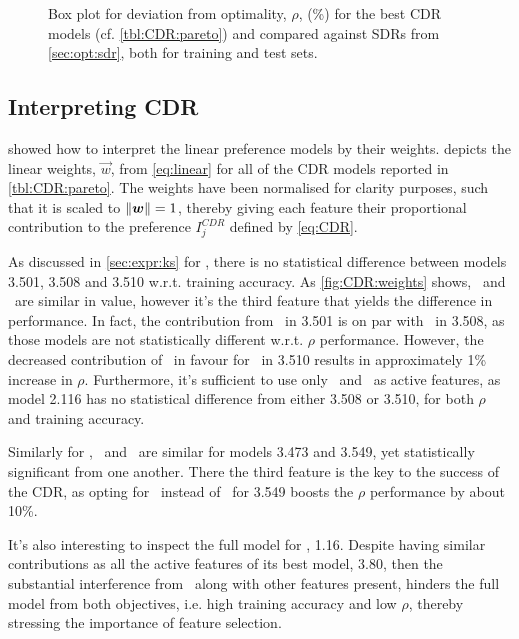 \documentclass[smallextended]{svjour3}
\begin{document}
\begin{figure}[p]
\caption{Box plot for deviation from optimality, $\rho$, (\%) for the best CDR models (cf. \cref{tbl:CDR:pareto}) and compared against SDRs from \cref{sec:opt:sdr}, both for training and test sets.}\label{fig:boxplot:CDR}
\end{figure}


\subsection{Interpreting CDR}\label{sec:CDR:interpret}
 showed how to interpret the linear preference  models by their weights. 
depicts the linear weights, $\vec{w}$, from \cref{eq:linear} for all of the CDR models reported in \cref{tbl:CDR:pareto}. The weights have been normalised for clarity purposes, such that it is scaled to $\norm{\vec{w}}=1$, thereby giving each feature their proportional contribution to the  preference $I_j^{CDR}$ defined by \cref{eq:CDR}.

As discussed in \cref{sec:expr:ks} for , there is no statistical difference between models 3.501, 3.508 and 3.510 w.r.t. training accuracy. As \cref{fig:CDR:weights} shows, \phimakespan\ and \phiwrmJob\  are similar in value, however it's the third feature that yields the difference in performance. In fact, the contribution from \phiproc\ in 3.501 is on par with \phimac\ in 3.508, as those models are not statistically different w.r.t. $\rho$ performance. However, the decreased contribution of \phimakespan\  in favour for \phimacFree\ in 3.510 results in approximately 1\% increase in $\rho$. Furthermore, it's sufficient to use only \phimakespan\ and \phiwrmJob\  as active features, as model 2.116 has no statistical difference from either 3.508 or 3.510, for both $\rho$ and training accuracy.

Similarly for , \phiwrmJob\ and \phiendTime\ are similar for models 3.473 and 3.549, yet statistically significant from one another. There the third feature is the key to the success of the CDR, as opting for \phiwrmMac\ instead of \phiwait\ for 3.549 boosts the $\rho$ performance by about 10\%. 

It's also interesting to inspect the full model for , 1.16. Despite having similar contributions as all the active features of its best model, 3.80, then the substantial interference from \phijobOps\ along with other features present, hinders the full model from both objectives, i.e. high training accuracy and low $\rho$, thereby stressing the importance of feature selection. 
\end{document}
